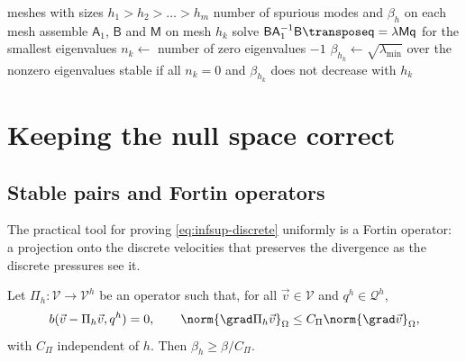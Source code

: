 \begin{algorithm}[tbp]
    \caption[Numerical test of the inf-sup condition]{Numerical test of the inf-sup condition for a velocity--pressure pair.}
    \label{alg:infsup-estimate}
    \begin{algorithmic}[1]
        \Require meshes with sizes $h_1 > h_2 > \dots > h_m$
        \Ensure number of spurious modes and $\beta_h$ on each mesh
            \State assemble $\mathsf{A}_1$, $\mathsf{B}$ and $\mathsf{M}$ on mesh $h_k$
            \State solve $\mathsf{B} \mathsf{A}_1^{-1} \mathsf{B}\transpose \mathsf{q} = \lambda \mathsf{M} \mathsf{q}$ for the smallest eigenvalues
            \State $n_k \gets$ number of zero eigenvalues $- 1$ 
            \State $\beta_{h_k} \gets \sqrt{\lambda_\mathrm{min}}$ over the nonzero eigenvalues
        \EndFor
        \State \Return stable if all $n_k = 0$ and $\beta_{h_k}$ does not decrease with $h_k$
    \end{algorithmic}
\end{algorithm}

\section{Keeping the null space correct}\label{sec:infsup-remedies}

\subsection{Stable pairs and Fortin operators}

The practical tool for proving \cref{eq:infsup-discrete} uniformly is a Fortin operator: a projection onto the discrete velocities that preserves the divergence as the discrete pressures see it.

\begin{theorem}\label{thm:infsup-fortin}
Let $\Pi_h \colon \mathcal{V} \to \mathcal{V}^h$ be an operator such that, for all $\vec{v} \in \mathcal{V}$ and $q^h \in \mathcal{Q}^h$,
\[
    b(\vec{v} - \Pi_h\vec{v}, q^h) = 0, \qquad \norm{\grad \Pi_h\vec{v}}_\Omega \leq C_\Pi \norm{\grad\vec{v}}_\Omega,
\]
with $C_\Pi$ independent of $h$. Then $\beta_h \geq \beta / C_\Pi$.
\end{theorem}


